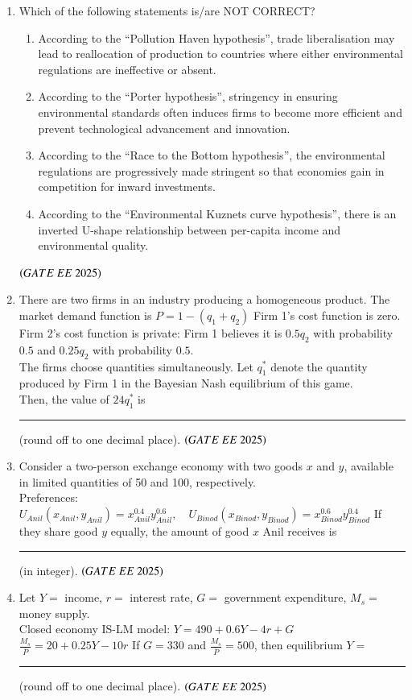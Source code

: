 \documentclass[journal,12pt,onecolumn]{IEEEtran}
\theoremstyle{remark}
\begin{document}
\begin{enumerate}
\item Which of the following statements is/are NOT CORRECT?
\begin{enumerate}
\item According to the ``Pollution Haven hypothesis'', trade liberalisation may lead to reallocation of production to countries where either environmental regulations are ineffective or absent.
\item According to the ``Porter hypothesis'', stringency in ensuring environmental standards often induces firms to become more efficient and prevent technological advancement and innovation.
\item According to the ``Race to the Bottom hypothesis'', the environmental regulations are progressively made stringent so that economies gain in competition for inward investments.
\item According to the ``Environmental Kuznets curve hypothesis'', there is an inverted U-shape relationship between per-capita income and environmental quality.
\end{enumerate}
\hfill $\brak{GATE\ EE\ 2025}$

\item There are two firms in an industry producing a homogeneous product. The market demand function is
$
P = 1 - (q_1 + q_2)
$
Firm 1's cost function is zero. Firm 2's cost function is private: Firm 1 believes it is $0.5q_2$ with probability $0.5$ and $0.25q_2$ with probability $0.5$. \\
The firms choose quantities simultaneously. Let $q_1^*$ denote the quantity produced by Firm 1 in the Bayesian Nash equilibrium of this game. \\
Then, the value of $24q_1^*$ is \rule{2cm}{0.4pt} (round off to one decimal place).
\hfill $\brak{GATE\ EE\ 2025}$

\item Consider a two-person exchange economy with two goods $x$ and $y$, available in limited quantities of 50 and 100, respectively. \\
Preferences:
$
U_{Anil}(x_{Anil}, y_{Anil}) = x_{Anil}^{0.4} y_{Anil}^{0.6}, \quad
U_{Binod}(x_{Binod}, y_{Binod}) = x_{Binod}^{0.6} y_{Binod}^{0.4}
$
If they share good $y$ equally, the amount of good $x$ Anil receives is \rule{2cm}{0.4pt} (in integer).
\hfill $\brak{GATE\ EE\ 2025}$

\item Let $Y =$ income, $r =$ interest rate, $G =$ government expenditure, $M_s =$ money supply. \\
Closed economy IS-LM model:
$
Y = 490 + 0.6Y - 4r + G
$
$
\frac{M_s}{\bar{P}} = 20 + 0.25Y - 10r
$
If $G=330$ and $\frac{M_s}{\bar{P}}=500$, then equilibrium $Y=$ \rule{2cm}{0.4pt} (round off to one decimal place).
\hfill $\brak{GATE\ EE\ 2025}$


\end{enumerate}
\end{document}
